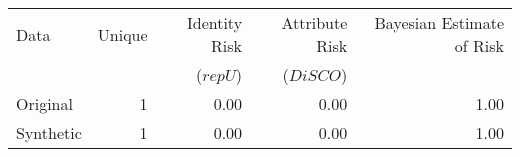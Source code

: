 \begin{tabular}{lrrrr}
  \toprule
Data & Unique &  Identity Risk  & Attribute Risk  & Bayesian Estimate of Risk \\ 
 & & ($repU$) & ($DiSCO$) & \\
  \midrule
Original & 1&  0.00 & 0.00 &  1.00 \\ 
  Synthetic & 1& 0.00 & 0.00 & 1.00 \\ 
   \bottomrule
\end{tabular}
